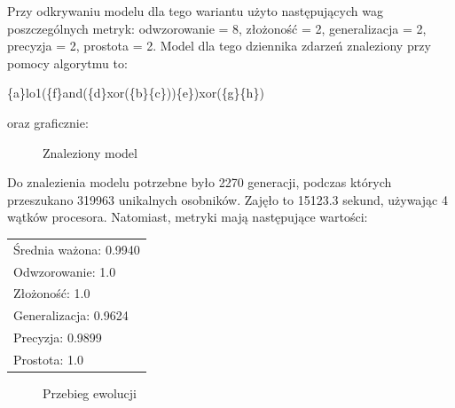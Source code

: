 Przy odkrywaniu modelu dla tego wariantu użyto następujących wag poszczególnych metryk: odwzorowanie = 8, złożoność = 2, generalizacja = 2, precyzja = 2, prostota = 2. Model dla tego dziennika zdarzeń znaleziony przy pomocy algorytmu to:
\begin{center}
	\{a\}lo1(\{f\}and(\{d\}xor(\{b\}\{c\}))\{e\})xor(\{g\}\{h\})
\end{center}
oraz graficznie:

\begin{figure}[H]
	\caption{\label{fig:flow_chart}Znaleziony model}
\end{figure}

Do znalezienia modelu potrzebne było 2270 generacji, podczas których przeszukano 319963 unikalnych osobników. Zajęło to 15123.3 sekund, używając 4 wątków procesora. Natomiast, metryki mają następujące wartości: 

 \begin{center}
  \begin{tabular}{l}
	Średnia ważona: 0.9940 \\
	Odwzorowanie: 1.0 \\
	Złożoność: 1.0 \\
	Generalizacja: 0.9624 \\
	Precyzja: 0.9899 \\
	Prostota: 1.0
  \end{tabular}
 \end{center}
 
\begin{figure}[H]
	\caption{\label{fig:flow_chart}Przebieg ewolucji}
\end{figure}

